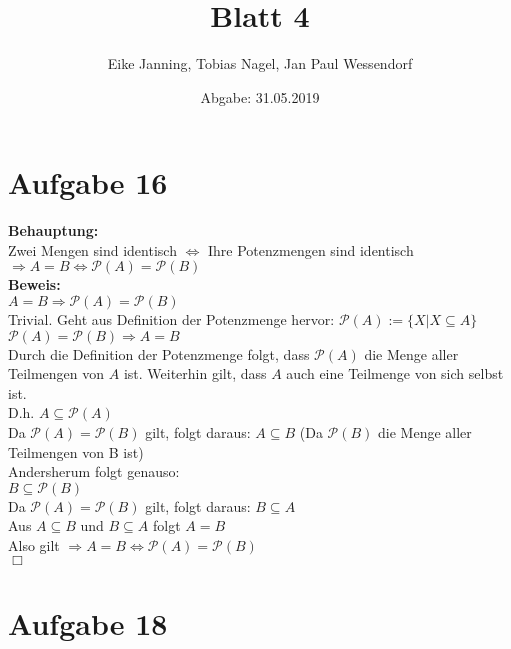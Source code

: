 \documentclass[paper = a4, ngerman]{scrartcl}
\title{Blatt 4}
\author{Eike Janning, Tobias Nagel, Jan Paul Wessendorf}
\date{Abgabe: 31.05.2019}
\begin{document}
	\maketitle
	\hrulefill
	
	\section*{Aufgabe 16}
	
	\textbf{Behauptung:}\\
	Zwei Mengen sind identisch $\Leftrightarrow$ Ihre Potenzmengen sind identisch\\
	
	$\Rightarrow A = B \Leftrightarrow \mathcal{P}(A) = \mathcal{P}(B) $\\
	
	\textbf{Beweis:}\\
	$ A = B \Rightarrow \mathcal{P}(A) = \mathcal{P}(B) $\\
	Trivial. Geht aus Definition der Potenzmenge hervor: $\mathcal{P}(A) := \{ X | X \subseteq A\}$\\
	
	$\mathcal{P}(A) = \mathcal{P}(B) \Rightarrow A = B$\\
	
	Durch die Definition der Potenzmenge folgt, dass $\mathcal{P}(A)$ die Menge aller Teilmengen von $A$ ist. Weiterhin gilt, dass $A$ auch eine Teilmenge von sich selbst ist.\\
	D.h. $A \subseteq \mathcal{P}(A)$\\
	Da $\mathcal{P}(A) = \mathcal{P}(B)$ gilt, folgt daraus: $A \subseteq B$  (Da $\mathcal{P}(B)$ die Menge aller Teilmengen von B ist)\\
	
	Andersherum folgt genauso:\\
	$B \subseteq \mathcal{P}(B)$\\
	Da $\mathcal{P}(A) = \mathcal{P}(B)$ gilt, folgt daraus: $B \subseteq A$\\
	
	Aus $A \subseteq B$ und $B \subseteq A$ folgt $A = B$\\
	
	Also gilt 	$\Rightarrow A = B \Leftrightarrow \mathcal{P}(A) = \mathcal{P}(B) $\\
	
	\hfil$\Box$
	\section*{Aufgabe 18}
	
\end{document}
